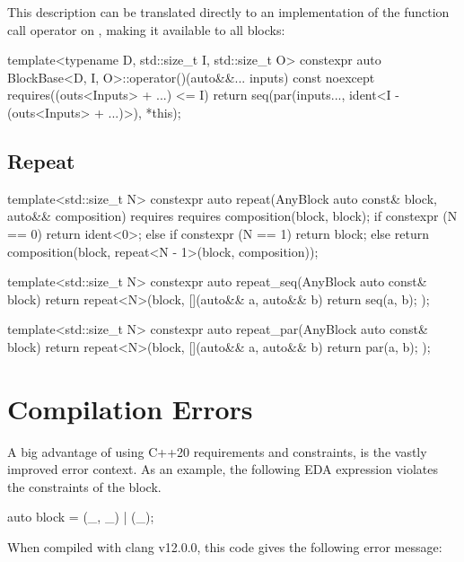 This description can be translated directly to an implementation of the function call operator on
, making it available to all blocks:

\begin{cppcodenl}
  template<typename D, std::size_t I, std::size_t O>
  constexpr auto BlockBase<D, I, O>::operator()(auto&&... inputs) const noexcept
  requires((outs<Inputs> + ...) <= I)
  {
    return seq(par(inputs..., ident<I - (outs<Inputs> + ...)>), *this);
  }
\end{cppcodenl}

\subsection{Repeat}
\begin{cppcodenl}
  template<std::size_t N>
  constexpr auto repeat(AnyBlock auto const& block, auto&& composition) 
  requires requires { composition(block, block); }
  {
    if constexpr (N == 0) {
      return ident<0>;
    } else if constexpr (N == 1) {
      return block;
    } else {
      return composition(block, repeat<N - 1>(block, composition));
    }
  }

  template<std::size_t N>
  constexpr auto repeat_seq(AnyBlock auto const& block)
  {
    return repeat<N>(block, [](auto&& a, auto&& b) { return seq(a, b); });
  }

  template<std::size_t N>
  constexpr auto repeat_par(AnyBlock auto const& block)
  {
    return repeat<N>(block, [](auto&& a, auto&& b) { return par(a, b); });
  }
\end{cppcodenl}

\section{Compilation Errors}
\label{sec:eda_errors}

A big advantage of using C++20 requirements and constraints, is the vastly improved error context. As an
example, the following EDA expression violates the constraints of the \Sequential block.

\begin{cppcodenl}
auto block = (_, _) | (_);
\end{cppcodenl}

When compiled with clang v12.0.0, this code gives the following error message:

